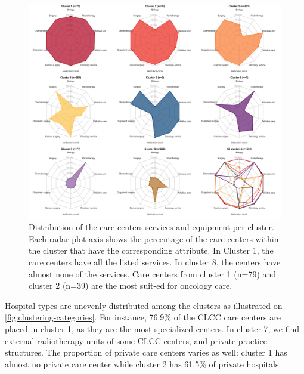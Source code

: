 \begin{figure}[h]
    \includegraphics[width=\textwidth]{images/camion/fig1_clusters_services.png}
    \centering
    \caption{
        Distribution of the care centers services and equipment per cluster. Each radar plot axis shows the percentage of the care centers within the cluster that have the corresponding attribute. In Cluster 1, the care centers have all the listed services. In cluster 8, the centers have almost none of the services. Care centers from cluster 1 (n=79) and cluster 2 (n=39) are the most suit-ed for oncology care.
    }
    \label{fig:clustering-spider}
\end{figure}

Hospital types are unevenly distributed among the clusters as illustrated on \cref{fig:clustering-categories}. For instance, 76.9\% of the CLCC care centers are placed in cluster 1, as they are the most specialized centers. In cluster 7, we find external radiotherapy units of some CLCC centers, and private practice structures. The proportion of private care centers varies as well: cluster 1 has almost no private care center while cluster 2 has 61.5\% of private hospitals.

